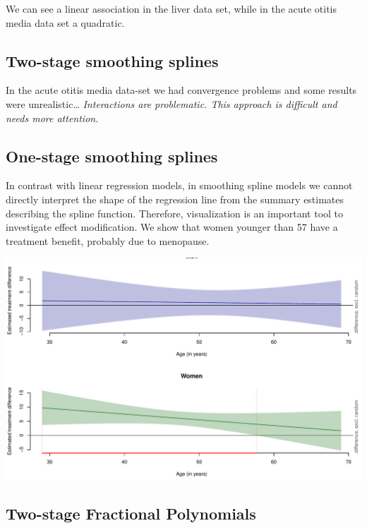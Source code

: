 \documentclass[14pt,]{article}
\begin{document}
We can see a linear association in the liver data set, while in the
acute otitis media data set a quadratic.

\hypertarget{two-stage-smoothing-splines}{%
\subsection{Two-stage smoothing
splines}\label{two-stage-smoothing-splines}}

In the acute otitis media data-set we had convergence problems and some
results were unrealistic\ldots{} \emph{Interactions are problematic.
This approach is difficult and needs more attention}.

\hypertarget{one-stage-smoothing-splines}{%
\subsection{One-stage smoothing
splines}\label{one-stage-smoothing-splines}}

In contrast with linear regression models, in smoothing spline models we
cannot directly interpret the shape of the regression line from the
summary estimates describing the spline function. Therefore,
visualization is an important tool to investigate effect modification.
We show that women younger than 57 have a treatment benefit, probably
due to menopause.

\includegraphics{Figs/One-Stage smoothing splines in Somatostatin-1.pdf}

\hypertarget{two-stage-fractional-polynomials}{%
\subsection{Two-stage Fractional
Polynomials}\label{two-stage-fractional-polynomials}}
\end{document}
